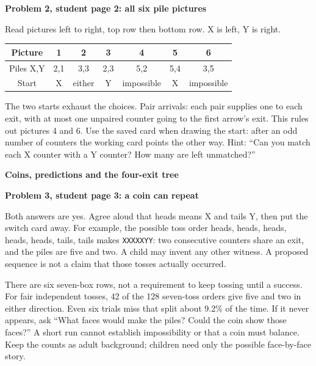 \documentclass[11pt]{article}
\newcommand{\head}[1]{\par\textbf{\large #1}\par}
\newcommand{\sub}[1]{\par\textbf{#1}\par}
\newcommand{\code}[1]{\texttt{#1}}
\begin{document}
\sub{Problem 2, student page 2: all six pile pictures}
Read pictures left to right, top row then bottom row. X is left, Y is right.
\begin{center}
\begin{tabular}{ccccccc}
\toprule
Picture & 1 & 2 & 3 & 4 & 5 & 6\\
\midrule
Piles X,Y & 2,1 & 3,3 & 2,3 & 5,2 & 5,4 & 3,5\\
Start & X & either & Y & impossible & X & impossible\\
\bottomrule
\end{tabular}
\end{center}
The two starts exhaust the choices. Pair arrivals: each pair supplies one to each exit, with at most one unpaired counter going to the first arrow's exit. This rules out pictures 4 and 6. Use the saved card when drawing the start: after an odd number of counters the working card points the other way. Hint: ``Can you match each X counter with a Y counter? How many are left unmatched?''
\newpage

\head{Coins, predictions and the four-exit tree}
\sub{Problem 3, student page 3: a coin can repeat}
Both answers are yes. Agree aloud that heads means X and tails Y, then put the switch card away. For example, the possible toss order heads, heads, heads, heads, heads, tails, tails makes \code{XXXXXYY}: two consecutive counters share an exit, and the piles are five and two. A child may invent any other witness. A proposed sequence is not a claim that those tosses actually occurred.

There are six seven-box rows, not a requirement to keep tossing until a success. For fair independent tosses, 42 of the 128 seven-toss orders give five and two in either direction. Even six trials miss that split about 9.2\% of the time. If it never appears, ask ``What faces would make the piles? Could the coin show those faces?'' A short run cannot establish impossibility or that a coin must balance. Keep the counts as adult background; children need only the possible face-by-face story.
\end{document}
